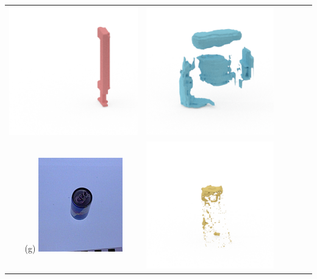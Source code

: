 \documentclass[10pt,onecolumn,letterpaper]{article}
\begin{document}
\begin{tabular}{cccccc}
\includegraphics[height=\turnheight, clip=true, trim=60 30 30 5]{sunkist_fruit_snacks_mixed_fruit_NP4_0_zheng_view_90.png} &
\includegraphics[height=\turnheight, clip=true, trim=60 30 30 5]{sunkist_fruit_snacks_mixed_fruit_NP4_0_oma_view_90} \\
(g) \includegraphics[height=\turnheight, clip=true, trim=20 30 30 5]{red_bull.png} &
\includegraphics[height=\turnheight, clip=true, trim=60 30 30 5]{red_bull_NP4_0_visible_pixels_view_270.png} &

\end{tabular}
\end{document}
